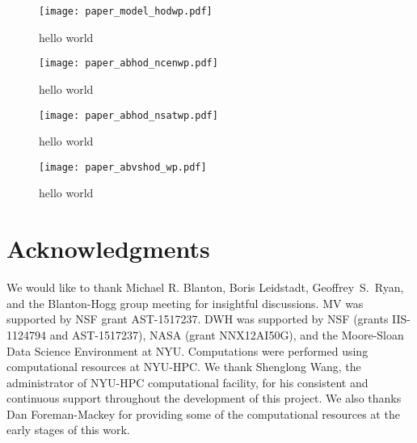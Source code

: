 \documentclass[14pt, preprint]{emulateapj}
\begin{document}
\begin{figure*}
\begin{center}
\texttt{[image: paper\_model\_hodwp.pdf]}
\caption{hello world}
\label{fig:abc_converge}
\end{center}
\end{figure*}
\begin{figure*}
\begin{center}
\texttt{[image: paper\_abhod\_ncenwp.pdf]}
\caption{hello world}
\label{fig:abc_converge}
\end{center}
\end{figure*}
\begin{figure*}
\begin{center}
\texttt{[image: paper\_abhod\_nsatwp.pdf]}
\caption{hello world}
\label{fig:abc_converge}
\end{center}
\end{figure*}
\begin{figure*}
\begin{center}
\texttt{[image: paper\_abvshod\_wp.pdf]}
\caption{hello world}
\label{fig:abc_converge}
\end{center}
\end{figure*}
\section*{Acknowledgments}
We would like to thank Michael R. Blanton,  
Boris Leidstadt, Geoffrey~S.~Ryan, and the Blanton-Hogg group meeting for insightful discussions. MV was supported by NSF grant AST-1517237. DWH was supported 
by NSF (grants IIS-1124794 and AST-1517237), NASA (grant NNX12AI50G), and the Moore-Sloan 
Data Science Environment at NYU. Computations 
were performed using computational resources at NYU-HPC. We thank Shenglong Wang, the 
administrator of NYU-HPC computational facility, for his consistent and continuous support 
throughout the development of this project. We also thanks Dan Foreman-Mackey for providing some of the computational resources at the early stages of this work.
\end{document}
